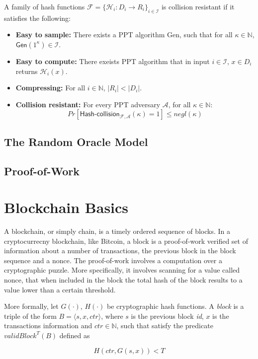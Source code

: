 \begin{defn}\label{def:hash_function}
	A family of hash functions $\mathcal{F} = \{ \mathcal{H}_i: D_i \rightarrow R_i \}_{i \in \mathcal{I}}$ is collision resistant if it satisfies the following:
	\begin{itemize}
		\item \textbf{Easy to sample:} There exists a PPT algorithm \textsf{Gen}, such that for all $\kappa \in \mathbb{N}$, $\textsf{Gen}(1^\kappa) \in \mathcal{I}$.
		\item \textbf{Easy to compute:} There exeists PPT algorithm that in input $i \in \mathcal{I}$, $x \in D_i$ returns $\mathcal{H}_i(x)$.
		\item \textbf{Compressing:} For all $i \in \mathbb{N}$, $\lvert R_i \rvert < \lvert D_i \rvert$.
		\item \textbf{Collision resistant:} For every PPT adversary $\mathcal{A}$, for all $\kappa \in \mathbb{N}$:
		\begin{equation*}
			Pr[\textsf{Hash-collision}_{ \mathcal{F}, \mathcal{A}}(\kappa) = 1] \leq negl(\kappa)
		\end{equation*}
	\end{itemize}
\end{defn}

\subsection{The Random Oracle Model}

\subsection{Proof-of-Work}

\section{Blockchain Basics}
A blockchain, or simply chain, is a timely ordered sequence of blocks.  In a cryptocurrecny
blockchain, like Bitcoin, a block is a proof-of-work verified set of information about a number of
transactions, the previous block in the block sequence and a nonce. The proof-of-work involves a
computation over a cryptographic puzzle. More specifically, it involves scanning for a value called
nonce, that when included in the block the total hash of the block results to a value lower than a
certain threshold.

More formally, let $G(\cdot)$, $H(\cdot)$ be cryptographic hash functions. A \textit{block} is a
triple of the form $B = \langle s, x, ctr \rangle$, where $s$ is the previous block \textit{id}, $x$
is the transactions information and $ctr \in \mathbb{N}$, such that satisfy the predicate
$validBlock^T(B)$ defined as
\begin{center}
\begin{equation}
	H(ctr, G(s,x)) < T
\end{equation}
\end{center}

